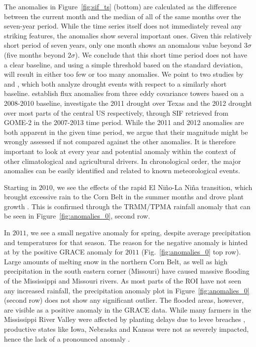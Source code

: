 \documentclass[preprint, a4paper, 10pt, times, 5p]{elsarticle}
\begin{document}
The anomalies in Figure~\ref{fig:sif_ts} (bottom) are calculated as the difference between the current month and the median of all of the same months over the seven-year period. While the time series itself does not immediately reveal any striking features, the anomalies show several important ones. Given this relatively short period of seven years, only one month shows an anomalous value beyond $3\sigma$ (five months beyond $2\sigma$). We conclude that this short time period does not have a clear baseline, and using a simple threshold based on the standard deviation, will result in either too few or too many anomalies. We point to two studies by \citet{sun2015drought} and \citet{wolf2016warm}, which both analyze drought events with respect to a similarly short baseline. \citet{wolf2016warm} establish flux anomalies from three eddy covariance towers based on a 2008-2010 baseline,  \citet{sun2015drought} investigate the 2011 drought over Texas and the 2012 drought over most parts of the central US respectively, through SIF retrieved from GOME-2 in the 2007-2013 time period. While the 2011 and 2012 anomalies are both apparent in the given time period, we argue that their magnitude might be wrongly assessed if not compared against the other anomalies. It is therefore important to look at every year and potential anomaly within the context of other climatological and agricultural drivers. In chronological order, the major anomalies can be easily identified and related to known meteorological events. 

Starting in $2010$, we see the effects of the rapid El Ni\~no-La Ni\~na transition, which brought excessive rain to the Corn Belt in the summer months and drove plant growth \citep{USDA2010}. This is confirmed through the TRMM/TPMA rainfall anomaly that can be seen in Figure~\ref{fig:anomalies_0}, second row.

In $2011$, we see a small negative anomaly for spring, despite average precipitation and temperatures for that season. The reason for the negative anomaly is hinted at by the positive GRACE anomaly for $2011$ (Fig.~\ref{fig:anomalies_0} top row). Large amounts of melting snow in the northern Corn Belt, as well as high precipitation in the south eastern corner (Missouri) have caused massive flooding of the Mississippi and Missouri rivers. As most parts of the ROI have not seen any increased rainfall, the precipitation anomaly plot in Figure~\ref{fig:anomalies_0} (second row) does not show any significant outlier. The flooded areas, however, are visible as a positive anomaly in the GRACE data. While many farmers in the Mississippi River Valley were affected by planting delays due to levee breaches \citep{olson2012impacts}, productive states like Iowa, Nebraska and Kansas were not as severely impacted, hence the lack of a pronounced anomaly \citep{USDA2011}. 
\end{document}
